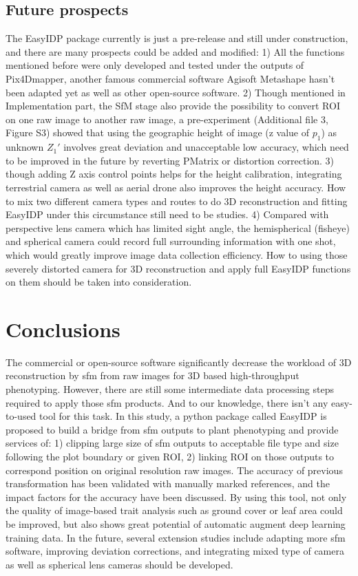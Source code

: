 \documentclass[doublespacing]{configs/bmcart}
\begin{document}
\subsection*{Future prospects}
The EasyIDP package currently is just a pre-release and still under construction, and there are many prospects could be added and modified: 1) All the functions mentioned before were only developed and tested under the outputs of Pix4Dmapper, another famous commercial software Agisoft Metashape hasn't been adapted yet as well as other open-source software. 2) Though mentioned in Implementation part, the SfM stage also provide the possibility to convert ROI on one raw image to another raw image, a pre-experiment (Additional file 3, Figure S3) showed that using the geographic height of image (z value of $p_1$) as unknown $Z_1'$ involves great deviation and unacceptable low accuracy, which need to be improved in the future by reverting PMatrix or distortion correction. 3) though adding Z axis control points helps for the height calibration, integrating terrestrial camera as well as aerial drone also improves the height accuracy. How to mix two different camera types and routes to do 3D reconstruction and fitting EasyIDP under this circumstance still need to be studies. 4) Compared with perspective lens camera which has limited sight angle, the hemispherical (fisheye) and spherical camera could record full surrounding information with one shot, which would greatly improve image data collection efficiency. How to using those severely distorted camera for 3D reconstruction and apply full EasyIDP functions on them should be taken into consideration.

\section*{Conclusions}
The commercial or open-source software significantly decrease the workload of 3D reconstruction by \acrshort*{sfm} from raw images for 3D based high-throughput phenotyping. However, there are still some intermediate data processing steps required to apply those \acrshort*{sfm} products. And to our knowledge, there isn't any easy-to-used tool for this task. In this study, a python package called EasyIDP is proposed to build a bridge from \acrshort*{sfm} outputs to plant phenotyping and provide services of: 1) clipping large size of \acrshort*{sfm} outputs to acceptable file type and size following the plot boundary or given ROI, 2) linking ROI on those outputs to correspond position on original resolution raw images. The accuracy of previous transformation has been validated with manually marked references, and the impact factors for the accuracy have been discussed. By using this tool, not only the quality of image-based trait analysis such as ground cover or leaf area could be improved, but also shows great potential of automatic augment deep learning training data. In the future, several extension studies include adapting more \acrshort*{sfm} software, improving deviation corrections, and integrating mixed type of camera as well as spherical lens cameras should be developed.
\end{document}
